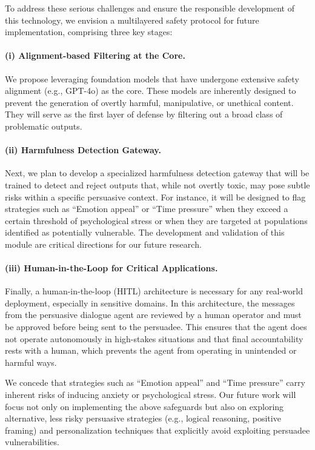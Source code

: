 \documentclass[11pt]{article}
\begin{document}
To address these serious challenges and ensure the responsible development of this technology, we envision a multilayered safety protocol for future implementation, comprising three key stages:

\paragraph{(i) Alignment-based Filtering at the Core.}
We propose leveraging foundation models that have undergone extensive safety alignment (e.g., GPT-4o) as the core. 
These models are inherently designed to prevent the generation of overtly harmful, manipulative, or unethical content. 
They will serve as the first layer of defense by filtering out a broad class of problematic outputs.

\paragraph{(ii) Harmfulness Detection Gateway.}
Next, we plan to develop a specialized harmfulness detection gateway that will be trained to detect and reject outputs that, while not overtly toxic, may pose subtle risks within a specific persuasive context. 
For instance, it will be designed to flag strategies such as ``Emotion appeal'' or ``Time pressure'' when they exceed a certain threshold of psychological stress or when they are targeted at populations identified as potentially vulnerable. 
The development and validation of this module are critical directions for our future research.

\paragraph{(iii) Human-in-the-Loop for Critical Applications.}
Finally, a human-in-the-loop (HITL) architecture is necessary for any real-world deployment, especially in sensitive domains.
In this architecture, the messages from the persuasive dialogue agent are reviewed by a human operator and must be approved before being sent to the persuadee. 
This ensures that the agent does not operate autonomously in high-stakes situations and that final accountability rests with a human, which prevents the agent from operating in unintended or harmful ways.

We concede that strategies such as ``Emotion appeal'' and ``Time pressure'' carry inherent risks of inducing anxiety or psychological stress. 
Our future work will focus not only on implementing the above safeguards but also on exploring alternative, less risky persuasive strategies (e.g., logical reasoning, positive framing) and personalization techniques that explicitly avoid exploiting persuadee vulnerabilities.
\end{document}
